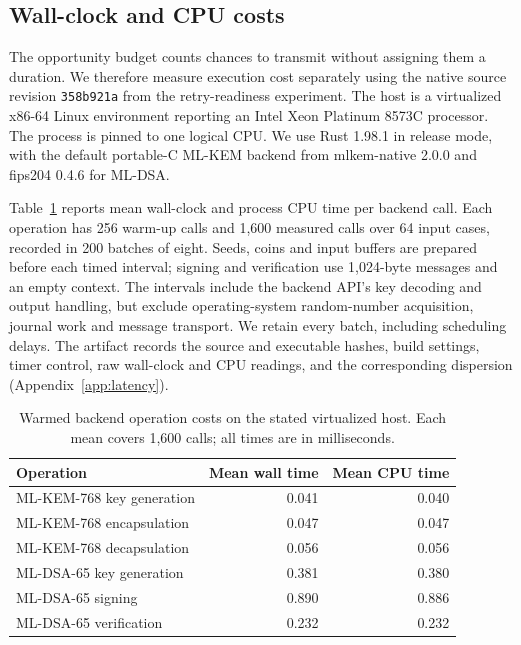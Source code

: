 \documentclass[pdflatex]{sn-jnl}
\theoremstyle{thmstyleone}
\theoremstyle{thmstylethree}
\theoremstyle{thmstyletwo}
\begin{document}
\subsection{Wall-clock and CPU costs}
\label{sec:latency}

The opportunity budget counts chances to transmit without assigning them
a duration. We therefore measure execution cost separately using the native
source revision \texttt{358b921a} from the retry-readiness experiment.
The host is a virtualized x86-64 Linux environment reporting an Intel Xeon
Platinum 8573C processor. The process is pinned to one logical CPU. We use
Rust 1.98.1 in release mode, with the default portable-C ML-KEM backend
from mlkem-native 2.0.0 and fips204 0.4.6 for ML-DSA.

Table~\ref{tab:primitive-latency} reports mean wall-clock and process CPU
time per backend call. Each operation has 256 warm-up calls and 1,600
measured calls over 64 input cases, recorded in 200 batches of eight.
Seeds, coins and input buffers are prepared before each timed interval;
signing and verification use 1,024-byte messages and an empty context.
The intervals include the backend API's key decoding and output handling,
but exclude operating-system random-number acquisition, journal work and
message transport. We retain every batch, including scheduling delays.
The artifact records the source and executable hashes, build settings,
timer control, raw wall-clock and CPU readings, and the corresponding
dispersion (Appendix~\ref{app:latency}).

\begin{table}[t]
\centering
\small
\caption{Warmed backend operation costs on the stated virtualized host.
Each mean covers 1,600 calls; all times are in milliseconds.}
\label{tab:primitive-latency}
\begin{tabularx}{\linewidth}{@{}Xrr@{}}
\toprule
Operation & Mean wall time & Mean CPU time\\
\midrule
ML-KEM-768 key generation & 0.041 & 0.040\\
ML-KEM-768 encapsulation & 0.047 & 0.047\\
ML-KEM-768 decapsulation & 0.056 & 0.056\\
ML-DSA-65 key generation & 0.381 & 0.380\\
ML-DSA-65 signing & 0.890 & 0.886\\
ML-DSA-65 verification & 0.232 & 0.232\\
\bottomrule
\end{tabularx}
\end{table}
\end{document}
